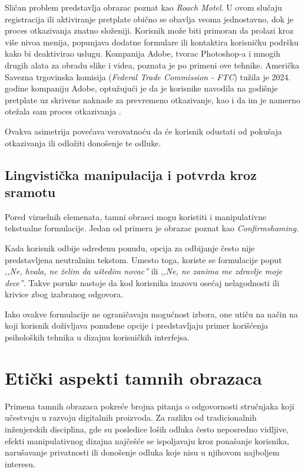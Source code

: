 \documentclass[12pt,a4paper]{article}
\begin{document}
Sličan problem predstavlja obrazac poznat kao \emph{Roach Motel}. U ovom slučaju registracija ili aktiviranje pretplate obično se obavlja veoma jednostavno, dok je proces otkazivanja znatno složeniji. Korisnik može biti primoran da prolazi kroz više nivoa menija, popunjava dodatne formulare ili kontaktira korisničku podršku kako bi deaktivirao uslugu. Kompanija Adobe, tvorac Photoshop-a i mnogih drugih alata za obradu slike i videa, poznata je po primeni ove tehnike. Američka Savezna trgovinska komisija (\emph{Federal Trade Commission - FTC}) tužila je 2024. godine kompaniju Adobe, optužujući je da je korisnike navodila na godišnje pretplate uz skrivene naknade za prevremeno otkazivanje, kao i da im je namerno otežala sam proces otkazivanja \cite{ftc2024adobe}.

Ovakva asimetrija povećava verovatnoću da će korisnik odustati od pokušaja otkazivanja ili odložiti donošenje te odluke.

\subsection{Lingvistička manipulacija i potvrda kroz sramotu}

Pored vizuelnih elemenata, tamni obrasci mogu koristiti i manipulativne tekstualne formulacije. Jedan od primera je obrazac poznat kao \emph{Confirmshaming}.

Kada korisnik odbije određenu ponudu, opcija za odbijanje često nije predstavljena neutralnim tekstom. Umesto toga, koriste se formulacije poput \emph{,,Ne, hvala, ne želim da uštedim novac''} ili \emph{,,Ne, ne zanima me zdravlje moje dece''}. Takve poruke nastoje da kod korisnika izazovu osećaj nelagodnosti ili krivice zbog izabranog odgovora.

Iako ovakve formulacije ne ograničavaju mogućnost izbora, one utiču na način na koji korisnik doživljava ponuđene opcije i predstavljaju primer korišćenja psiholoških tehnika u dizajnu korisničkih interfejsa.

\section{Etički aspekti tamnih obrazaca}

Primena tamnih obrazaca pokreće brojna pitanja o odgovornosti stručnjaka koji učestvuju u razvoju digitalnih proizvoda. Za razliku od tradicionalnih inženjerskih disciplina, gde su posledice loših odluka često neposredno vidljive, efekti manipulativnog dizajna najčešće se ispoljavaju kroz ponašanje korisnika, narušavanje privatnosti ili donošenje odluka koje nisu u njihovom najboljem interesu.
\end{document}
